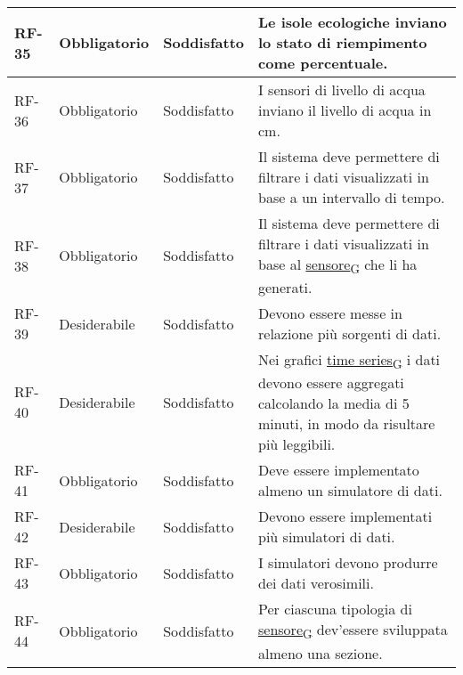 \begin{longtable}{|>{\centering\arraybackslash}m{}|>{\centering\arraybackslash}m{}|>{\centering\arraybackslash}m{}|>{\centering\arraybackslash}m{}|}
	RF-35           & Obbligatorio        & Soddisfatto                                                                                                           & Le isole ecologiche inviano lo stato di riempimento come percentuale.
	\\\hline
	RF-36           & Obbligatorio        & Soddisfatto                                                                                                           & I sensori di livello di acqua inviano il livello di acqua in cm.
	\\\hline
	RF-37           & Obbligatorio        & Soddisfatto                                                                                                           & Il sistema deve permettere di filtrare i dati visualizzati in base a un intervallo di tempo.
	\\\hline
	RF-38           & Obbligatorio        & Soddisfatto                                                                                                           & Il sistema deve permettere di filtrare i dati visualizzati in base al \href{https://7last.github.io/docs/pb/documentazione-interna/glossario\#sensore}{sensore\textsubscript{G}} che li ha generati.
	\\\hline
	RF-39           & Desiderabile        & Soddisfatto                                                                                                           & Devono essere messe in relazione più sorgenti di dati.
	\\\hline
	RF-40           & Desiderabile        & Soddisfatto                                                                                                           & Nei grafici \href{https://7last.github.io/docs/pb/documentazione-interna/glossario\#time-series}{time series\textsubscript{G}} i dati devono essere aggregati calcolando la media di 5 minuti, in modo da risultare più leggibili.
	\\\hline
	RF-41           & Obbligatorio        & Soddisfatto & Deve essere implementato almeno un simulatore di dati.
	\\\hline
	RF-42           & Desiderabile        & Soddisfatto & Devono essere implementati più simulatori di dati.
	\\\hline
	RF-43           & Obbligatorio        & Soddisfatto & I simulatori devono produrre dei dati verosimili.
	\\\hline
	RF-44           & Obbligatorio        & Soddisfatto & Per ciascuna tipologia di \href{https://7last.github.io/docs/pb/documentazione-interna/glossario\#sensore}{sensore\textsubscript{G}} dev'essere sviluppata almeno una sezione.

\end{longtable}
